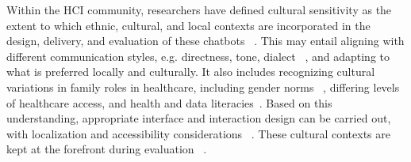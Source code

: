 Within the HCI community, researchers have defined cultural sensitivity as the extent to which ethnic, cultural, and local contexts are incorporated in the design, delivery, and evaluation of these chatbots ~\cite{adilazuarda2024measuringmodelingculturellms, shi2024culturebank, li2024culture}. This may entail aligning with different communication styles, e.g. directness, tone, dialect ~\cite{adilazuarda2024measuringmodelingculturellms, ondrejova2024can, li2024culturellm}, and adapting to what is preferred locally and culturally. It also includes recognizing cultural variations in family roles in healthcare, including gender norms ~\cite{anderson2003culturally, vaughn2009cultural,cerezo2023healthcare}, differing levels of healthcare access, and health and data literacies~\cite{almalki2020health, 10.1007/978-3-030-60114-0_10}. 
Based on this understanding, appropriate interface and interaction design can be carried out, with localization and accessibility considerations ~\cite{seitz2021empathic, habicht2024closing}. 
These cultural contexts are kept at the forefront during evaluation ~\cite{10.1007/978-3-030-60114-0_10, adilazuarda2024measuringmodelingculturellms}. 


